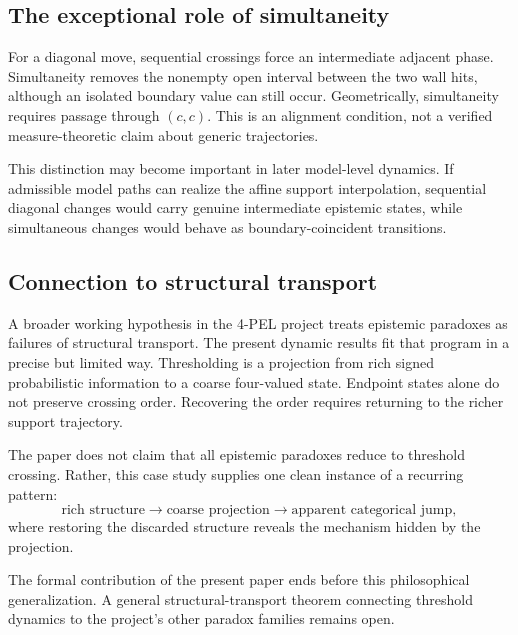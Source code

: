 \subsection{The exceptional role of simultaneity}

For a diagonal move, sequential crossings force an intermediate adjacent phase. Simultaneity removes the nonempty open interval between the two wall hits, although an isolated boundary value can still occur. Geometrically, simultaneity requires passage through \((c,c)\). This is an alignment condition, not a verified measure-theoretic claim about generic trajectories.

This distinction may become important in later model-level dynamics. If admissible model paths can realize the affine support interpolation, sequential diagonal changes would carry genuine intermediate epistemic states, while simultaneous changes would behave as boundary-coincident transitions.

\subsection{Connection to structural transport}

A broader working hypothesis in the 4-PEL project treats epistemic paradoxes as failures of structural transport. The present dynamic results fit that program in a precise but limited way. Thresholding is a projection from rich signed probabilistic information to a coarse four-valued state. Endpoint states alone do not preserve crossing order. Recovering the order requires returning to the richer support trajectory.

The paper does not claim that all epistemic paradoxes reduce to threshold crossing. Rather, this case study supplies one clean instance of a recurring pattern:
\[
  \text{rich structure}
  \longrightarrow
  \text{coarse projection}
  \longrightarrow
  \text{apparent categorical jump},
\]
where restoring the discarded structure reveals the mechanism hidden by the projection.

The formal contribution of the present paper ends before this philosophical generalization. A general structural-transport theorem connecting threshold dynamics to the project’s other paradox families remains open.
